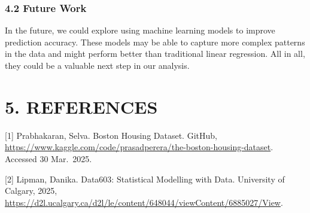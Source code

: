 \documentclass[
]{article}
\begin{document}
\subsubsection{4.2 Future Work}\label{future-work}

In the future, we could explore using machine learning models to improve
prediction accuracy. These models may be able to capture more complex
patterns in the data and might perform better than traditional linear
regression. All in all, they could be a valuable next step in our
analysis.

\section{5. REFERENCES}\label{references}

{[}1{]} Prabhakaran, Selva. Boston Housing Dataset. GitHub,
\url{https://www.kaggle.com/code/prasadperera/the-boston-housing-dataset}.
Accessed 30 Mar.~2025.

{[}2{]} Lipman, Danika. Data603: Statistical Modelling with Data.
University of Calgary, 2025,
\url{https://d2l.ucalgary.ca/d2l/le/content/648044/viewContent/6885027/View}.
\end{document}
